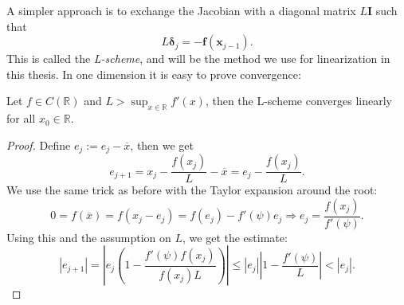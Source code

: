 \documentclass[../Main/main.tex]{subfiles}
\begin{document}
A simpler approach is to exchange the Jacobian with a diagonal matrix $L\pmb{I}$ such that 
\begin{equation}\label{eq:L-scheme}
	L\pmb{\delta}_j = - \pmb{f}(\pmb{x}_{j-1}).
\end{equation}
This is called the \emph{L-scheme}, and will be the  method we use for linearization in this thesis. In one dimension it is easy to prove convergence:

\begin{theorem}
	Let $f\in C(\mathbb{R})$ and $L>\sup_{x\in\mathbb{R}}f'(x)$, then the L-scheme converges linearly for all $x_0\in \mathbb{R}$.
\end{theorem}
\begin{proof}
	Define $e_j := e_j-\overline{x}$, then we get
	\begin{equation}
		e_{j+1} = x_j-\frac{f(x_j)}{L}-\overline{x}=e_j-\frac{f(x_j)}{L}.
	\end{equation}
	We use the same trick as before with the Taylor expansion around the root:
	\begin{equation}
		0 = f(\overline{x}) = f(x_j-e_j) = f(e_j)-f'(\psi)e_j\Rightarrow e_j = \frac{f(x_j)}{f'(\psi)}.
	\end{equation}
	Using this and the assumption on $L$, we get the estimate:
	\begin{equation}
		|e_{j+1}|=|e_j(1-\frac{f'(\psi)f(x_j)}{f(x_j)L})|\leq|e_j||1-\frac{f'(\psi)}{L}|<|e_j|.
	\end{equation}
\end{proof}
\end{document}
